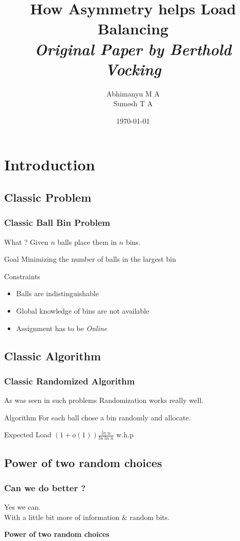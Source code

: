 \documentclass{beamer}
\title[Short title of the talk]{How Asymmetry helps Load Balancing \\ \small{\textit{Original Paper by Berthold Vocking}} }
\author{Abhimanyu M A \\ Sumesh T A}
\institute[U of X]
{
Indian Institute of Technology, Kanpur\\
}
\date{\today}
\begin{document}
%
\begin{frame}
\titlepage
\end{frame}
%

\section{Introduction}
\subsection{Classic Problem}
\begin{frame}
\frametitle{Classic Ball Bin Problem}
\begin{block}
{What ?}
Given $n$ balls place them in $n$ bins.
\end{block}
\pause
\begin{block}
{Goal}
Minimizing the number of balls in the largest bin  
\end{block}
\pause
\begin{block}
{Constraints}
\begin{itemize}
\item Balls are indistinguishable
\item Global knowledge of bins are not available
\item Assignment has to be \textit{Online}
\end{itemize}
\end{block}
\end{frame}

\subsection{Classic Algorithm}
\begin{frame}
\frametitle{Classic Randomized Algorithm}
As was seen in such problems Randomization works really well.
\pause
\begin{block}
{Algorithm}
For each ball chose a bin randomly and allocate. 
\end{block}
\pause
\begin{block}
{Expected Load}
$(1+o(1))\frac{ln \; n}{ln \; ln \; n}$ w.h.p
\end{block}
\end{frame}
\subsection{Power of two random choices}
\begin{frame}
\frametitle{Can we do better ?}
Yes we can. \\
\pause
With a little bit more of information \& random bits.\\
\begin{center}
  \textbf{Power of two random choices}
\end{center}
\end{frame}
\end{document}
